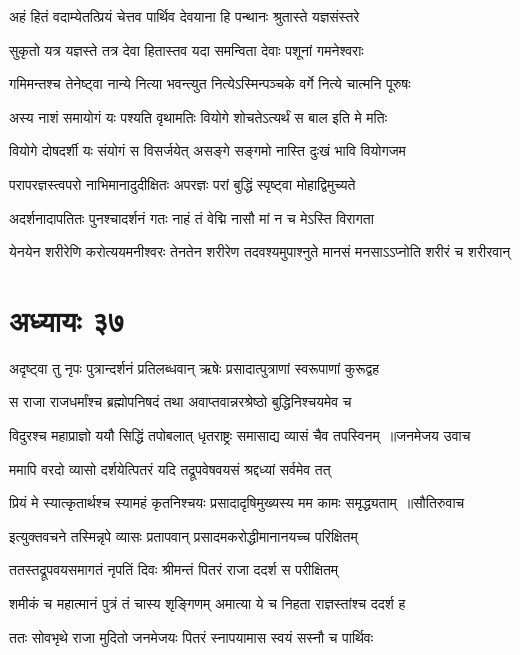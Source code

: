 \twolineshloka
{अहं हितं वदाम्येतत्प्रियं चेत्तव पार्थिव}
{देवयाना हि पन्थानः श्रुतास्ते यज्ञसंस्तरे}


\twolineshloka
{सुकृतो यत्र यज्ञस्ते तत्र देवा हितास्तव}
{यदा समन्विता देवाः पशूनां गमनेश्वराः}


\twolineshloka
{गमिमन्तश्च तेनेष्ट्वा नान्ये नित्या भवन्त्युत}
{नित्येऽस्मिन्पञ्चके वर्गे नित्ये चात्मनि पूरुषः}


\twolineshloka
{अस्य नाशं समायोगं यः पश्यति वृथामतिः}
{वियोगे शोचतेऽत्यर्थं स बाल इति मे मतिः}


\twolineshloka
{वियोगे दोषदर्शी यः संयोगं स विसर्जयेत्}
{असङ्गे सङ्गमो नास्ति दुःखं भावि वियोगजम}


\twolineshloka
{परापरज्ञस्त्वपरो नाभिमानादुदीक्षितः}
{अपरज्ञः परां बुद्धिं स्पृष्ट्वा मोहाद्विमुच्यते}


\twolineshloka
{अदर्शनादापतितः पुनश्चादर्शनं गतः}
{नाहं तं वेद्मि नासौ मां न च मेऽस्ति विरागता}


\threelineshloka
{येनयेन शरीरेणि करोत्ययमनीश्वरः}
{तेनतेन शरीरेण तदवश्यमुपाश्नुते}
{मानसं मनसाऽऽप्नोति शरीरं च शरीरवान्}


\chapter{अध्यायः ३७}
\twolineshloka
{अदृष्ट्वा तु नृपः पुत्रान्दर्शनं प्रतिलब्धवान्}
{ऋषेः प्रसादात्पुत्राणां स्वरूपाणां कुरूद्वह}


\threelineshloka
{स राजा राजधर्मांश्च ब्रह्मोपनिषदं तथा}
{अवाप्तवान्नरश्रेष्ठो बुद्धिनिश्चयमेव च}
{}


\threelineshloka
{विदुरश्च महाप्राज्ञो ययौ सिद्धिं तपोबलात्}
{धृतराष्ट्रः समासाद्य व्यासं चैव तपस्विनम् ॥जनमेजय उवाच}
{}


\twolineshloka
{ममापि वरदो व्यासो दर्शयेत्पितरं यदि}
{तद्रूपवेषवयसं श्रद्दध्यां सर्वमेव तत्}


\threelineshloka
{प्रियं मे स्यात्कृतार्थश्च स्यामहं कृतनिश्चयः}
{प्रसादादृषिमुख्यस्य मम कामः समृद्ध्यताम् ॥सौतिरुवाच}
{}


\twolineshloka
{इत्युक्तवचने तस्मिन्नृपे व्यासः प्रतापवान्}
{प्रसादमकरोद्धीमानानयच्च परिक्षितम्}


\twolineshloka
{ततस्तद्रूपवयसमागतं नृपतिं दिवः}
{श्रीमन्तं पितरं राजा ददर्श स परीक्षितम्}


\twolineshloka
{शमीकं च महात्मानं पुत्रं तं चास्य शृङ्गिणम्}
{अमात्या ये च निहता राज्ञस्तांश्च ददर्श ह}


\twolineshloka
{ततः सोवभृथे राजा मुदितो जनमेजयः}
{पितरं स्नापयामास स्वयं सस्नौ च पार्थिवः}


